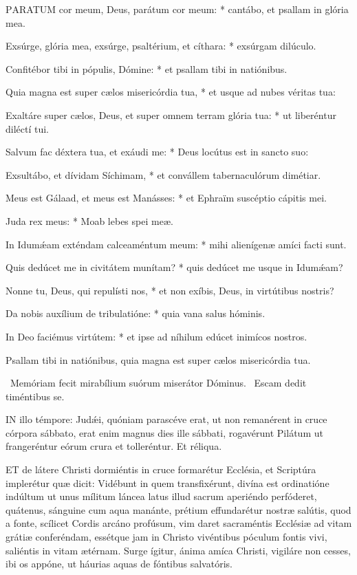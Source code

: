 
\lettrine[lines=2]{P}{ARATUM} cor meum, Deus, parátum cor meum: * cantábo, et psallam in glória mea.

Exsúrge, glória mea, exsúrge, psaltérium, et cíthara: * exsúrgam dilúculo.

Confitébor tibi in pópulis, Dómine: * et psallam tibi in natiónibus.

Quia magna est super cælos misericórdia tua, * et usque ad nubes véritas tua:

Exaltáre super cælos, Deus, et super omnem terram glória tua: * ut liberéntur diléctí tui.

Salvum fac déxtera tua, et exáudi me: * Deus locútus est in sancto suo:

Exsultábo, et dívidam Síchimam, * et convállem tabernaculórum dimétiar.

Meus est Gálaad, et meus est Manásses: * et Ephraïm suscéptio cápitis mei.

Juda rex meus: * Moab lebes spei meæ.

In Idumǽam exténdam calceaméntum meum: * mihi alienígenæ amíci facti sunt.

Quis dedúcet me in civitátem munítam? * quis dedúcet me usque in Idumǽam?

Nonne tu, Deus, qui repulísti nos, * et non exíbis, Deus, in virtútibus nostris?

Da nobis auxílium de tribulatióne: * quia vana salus hóminis.

In Deo faciémus virtútem: * et ipse ad níhilum edúcet inimícos nostros.

 Psallam tibi in natiónibus, quia magna est super cælos misericórdia tua.

\V\ Memóriam fecit mirabílium suórum miserátor Dóminus. \R\ Escam dedit timéntibus se.



\lettrine[lines=2]{I}{N} illo témpore: Judǽi, quóniam parascéve erat, ut non remanérent in cruce córpora sábbato, erat enim magnus dies ille sábbati, rogavérunt Pilátum ut frangeréntur eórum crura et tolleréntur. Et réliqua.



\lettrine[lines=2]{E}{T} de látere Christi dormiéntis in cruce formarétur Ecclésia, et Scriptúra implerétur quæ dicit: Vidébunt in quem transfixérunt, divína est ordinatióne indúltum ut unus mílitum láncea latus illud sacrum aperiéndo perfóderet, quátenus, sánguine cum aqua manánte, prétium effundarétur nostræ salútis, quod a fonte, scílicet Cordis arcáno profúsum, vim daret sacraméntis Ecclésiæ ad vitam grátiæ conferéndam, essétque jam in Christo vivéntibus póculum fontis vivi, saliéntis in vitam ætérnam. Surge ígitur, ánima amíca Christi, vigiláre non cesses, ibi os appóne, ut háurias aquas de fóntibus salvatóris.

